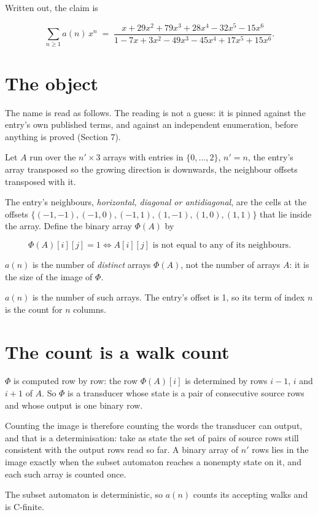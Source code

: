 \documentclass[11pt]{article}
\theoremstyle{definition}
\begin{document}
Written out, the claim is

\[\sum_{n \ge 1} a(n)\,x^n \;=\; \frac{x + 29x^{2} + 79x^{3} + 28x^{4} - 32x^{5} - 15x^{6}}{1 - 7x + 3x^{2} - 49x^{3} - 45x^{4} + 17x^{5} + 15x^{6}}.\]

\section{The object}

The name is read as follows. The reading is not a guess: it is pinned against the entry's own published terms, and against an independent enumeration, before anything is proved (Section 7).

Let $A$ run over the $n' \times 3$ arrays with entries in $\{0,\dots,2\}$, $n' = n$, the entry's array transposed so the growing direction is downwards, the neighbour offsets transposed with it.

The entry's neighbours, {\itshape horizontal, diagonal or antidiagonal}, are the cells at the offsets $\{(-1,-1), (-1,0), (-1,1), (1,-1), (1,0), (1,1)\}$ that lie inside the array. Define the binary array $\Phi(A)$ by

\[\Phi(A)[i][j] = 1 \iff A[i][j] \text{ is not equal to any of its neighbours}.\]

$a(n)$ is the number of {\itshape distinct} arrays $\Phi(A)$, not the number of arrays $A$: it is the size of the image of $\Phi$.

$a(n)$ is the number of such arrays. The entry's offset is 1, so its term of index $n$ is the count for $n$ columns.

\section{The count is a walk count}

$\Phi$ is computed row by row: the row $\Phi(A)[i]$ is determined by rows $i-1$, $i$ and $i+1$ of $A$. So $\Phi$ is a transducer whose state is a pair of consecutive source rows and whose output is one binary row.

Counting the image is therefore counting the words the transducer can output, and that is a determinisation: take as state the set of pairs of source rows still consistent with the output rows read so far. A binary array of $n'$ rows lies in the image exactly when the subset automaton reaches a nonempty state on it, and each such array is counted once.

The subset automaton is deterministic, so $a(n)$ counts its accepting walks and is C-finite.
\end{document}
